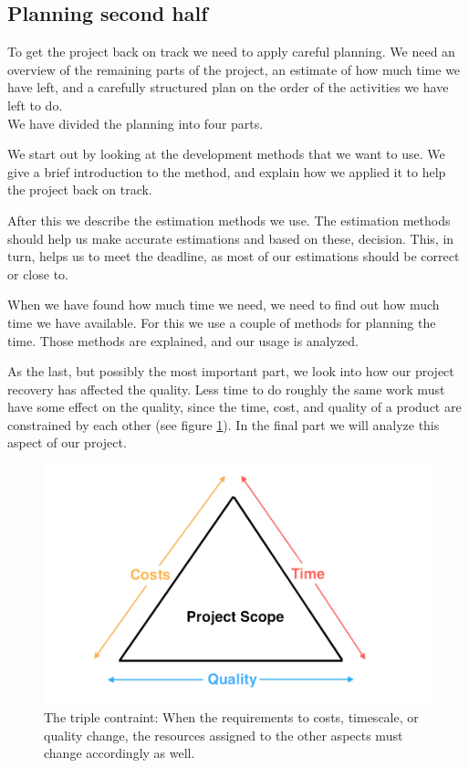 \subsection{Planning second half}
To get the project back on track we need to apply careful planning. We need an overview of the remaining parts of the project, an estimate of how much time we have left, and a carefully structured plan on the order of the activities we have left to do.\\
We have divided the planning into four parts.

We start out by looking at the development methods that we want to use. We give a brief introduction to the method, and explain how we applied it to help the project back on track.

After this we describe the estimation methods we use. The estimation methods should help us make accurate estimations and based on these, decision. This, in turn, helps us to meet the deadline, as most of our estimations should be correct or close to.

When we have found how much time we need, we need to find out how much time we have available. For this we use a couple of methods for planning the time. Those methods are explained, and our usage is analyzed.

As the last, but possibly the most important part, we look into how our project recovery has affected the quality. Less time to do roughly the same work must have some effect on the quality, since the time, cost, and quality of a product are constrained by each other \cite[p. 191]{PM} (see figure \ref{fig:timeCostsQuality}). In the final part we will analyze this aspect of our project.

\begin{figure}[H]
  \includegraphics[width=\textwidth]{illustrations/timeCostsQuality}
  \caption{The triple contraint: When the requirements to costs, timescale, or quality change, the resources assigned to the other aspects must change accordingly as well.}
  \label{fig:timeCostsQuality}
\end{figure}